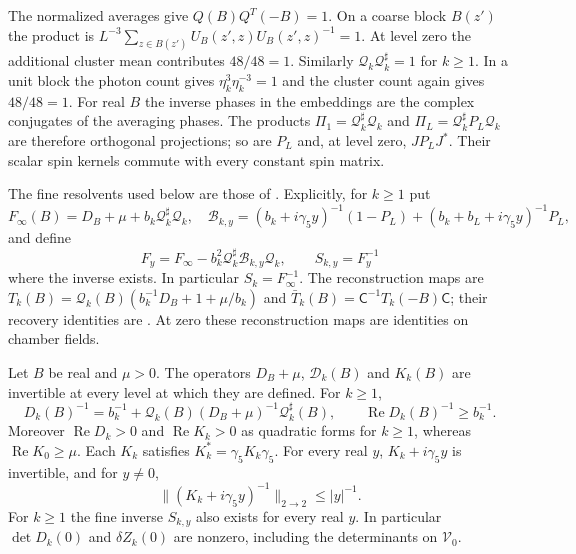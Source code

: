 The normalized averages give
$Q(B)Q^T(-B)=1$. On a coarse block $B(z')$ the product
is
$L^{-3}\sum_{z\in B(z')}U_B(z',z)U_B(z',z)^{-1}=1$.
At level zero the additional cluster mean contributes
$48/48=1$. Similarly
$\mathcal Q_k\mathcal Q_k^\sharp=1$ for $k\ge1$.
In a unit block the photon count gives
$\eta_k^3\eta_k^{-3}=1$ and the cluster count again
gives $48/48=1$.
For real $B$ the inverse phases in the embeddings are
the complex conjugates of the averaging phases.
The products $\Pi_1=\mathcal Q_k^\sharp\mathcal Q_k$
and $\Pi_L=\mathcal Q_k^\sharp P_L\mathcal Q_k$ are
therefore orthogonal projections; so are $P_L$ and,
at level zero, $JP_LJ^*$. Their scalar spin kernels
commute with every constant spin matrix.

The fine resolvents used below are those of
\cite[\S4.2]{FermionBlockManuscript}. Explicitly, for $k\ge1$ put
\[
 F_\infty(B)=D_B+\mu+b_k\mathcal Q_k^\sharp\mathcal Q_k,
 \quad
 \mathcal B_{k,y}=(b_k+i\gamma_5y)^{-1}(1-P_L)
                  +(b_k+b_L+i\gamma_5y)^{-1}P_L,
\]
and define
\[
 F_y=F_\infty-b_k^2\mathcal Q_k^\sharp\mathcal B_{k,y}\mathcal Q_k,
 \qquad S_{k,y}=F_y^{-1}
\]
where the inverse exists. In particular $S_k=F_\infty^{-1}$.
The reconstruction maps are
$T_k(B)=\mathcal Q_k(B)(b_k^{-1}D_B+1+\mu/b_k)$ and
$\bar T_k(B)=\mathsf C^{-1}T_k(-B)\mathsf C$;
their recovery identities are \cite[Theorem~B(iv)]{NormalizedContraction}.
At zero these reconstruction maps are identities on chamber fields.

\begin{proposition}\label{prop:rg-step-real-inverses}
Let $B$ be real and $\mu>0$. The operators
$D_B+\mu$, $\mathcal D_k(B)$ and $K_k(B)$ are
invertible at every level at which they are defined.
For $k\ge1$,
\begin{equation}\label{eq:rg-step-real-coarse-inverse}
 D_k(B)^{-1}=b_k^{-1}
           +\mathcal Q_k(B)(D_B+\mu)^{-1}\mathcal Q_k^\sharp(B),
 \qquad \operatorname{Re}D_k(B)^{-1}\ge b_k^{-1}.
\end{equation}
Moreover $\operatorname{Re}D_k>0$ and
$\operatorname{Re}K_k>0$ as quadratic forms for
$k\ge1$, whereas $\operatorname{Re}K_0\ge\mu$.
Each $K_k$ satisfies
$K_k^*=\gamma_5K_k\gamma_5$.
For every real $y$, $K_k+i\gamma_5y$ is invertible,
and for $y\ne0$,
\begin{equation}\label{eq:rg-step-real-resolvent}
 \|(K_k+i\gamma_5y)^{-1}\|_{2\to2}\le |y|^{-1}.
\end{equation}
For $k\ge1$ the fine inverse $S_{k,y}$ also
exists for every real $y$.
In particular $\det D_k(0)$ and $\delta Z_k(0)$
are nonzero, including the determinants on
$\mathscr V_0$.
\end{proposition}

